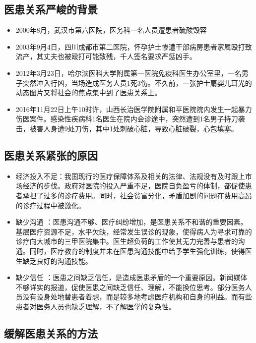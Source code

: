 \documentclass[11pt,twoside,a4paper]{article}
\begin{document}
		\subsection{医患关系严峻的背景}
		\begin{itemize}
		\item 2000年8月，武汉市第六医院，医务科一名人员遭患者硫酸毁容
		\item 2003年9月4日，四川成都市第二医院，怀孕护士惨遭干部病房患者家属殴打致流产，其丈夫也被殴打可能致残，千人签名要求严惩凶手。 
		\item 2012年3月23日，哈尔滨医科大学附属第一医院免疫科医生办公室里，一名男子突然冲入行凶，当场造成医务人员1死3伤。不久前，一张护士扇婴儿耳光的动态图片又将社会的焦点集中到了医患关系上。 
		\item 2016年11月22日上午10时许，山西长治医学院附属和平医院院内发生一起暴力伤医案件。感染性疾病科1名医生在院内会诊途中，突然遭到1名男子持刀袭击，被害人身遭9处刀伤，其中1处刺破心脏，导致心脏破裂，心包填塞。
		\end{itemize}
		
		\subsection{医患关系紧张的原因}
		\begin{itemize}
			\item 经济投入不足：我国现行的医疗保障体系及相关的法律、法规没有及时跟上市场经济的步伐。政府对医院的投入严重不足，医院自负盈亏的体制，都促使患者承担了过多的诊疗费用。同时，社会贫富分化，矛盾加剧的问题在费用高昂的诊疗过程中被激化。 
			\item 缺少沟通 ：医患沟通不够、医疗纠纷增加，是医患关系不和谐的重要因素。基层医疗资源不足，水平欠缺，经常发生误诊的现象，使得病人为寻求可靠的诊疗向大城市的三甲医院集中。医生超负荷的工作使其无力完善与患者的沟通。同时，医疗教育的制度并未在医患沟通技能中给予学生强化训练，使得医生缺乏良好的沟通技能。 
			\item 缺少信任 ：医患之间缺乏信任，是造成医患矛盾的一个重要原因。新闻媒体不够详实的报道，促使医患之间缺乏信任、理解，不能换位思考。部分医务人员没有设身处地替患者着想，而是较多地考虑医疗机构和自身的利益。而有些患者对医务人员也缺乏理解，不了解医学的复杂性。 
			
		\end{itemize}
		
		\subsection{缓解医患关系的方法 }
\end{document}
